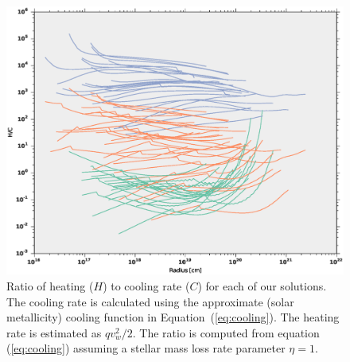 \documentclass[usenatbib,fleqn]{mn2e}
\newcommand{\vw}{v_w}
\begin{document}
\begin{figure}
  \includegraphics[width=\columnwidth]{cooling.eps}
  \caption{\label{fig:cooling} Ratio of heating ($H$) to cooling rate ($C$) for each of our solutions. The cooling rate is calculated using the approximate (solar metallicity) cooling function in Equation~(\ref{eq:cooling}). The heating rate is estimated as $q \vw^2/2$. The ratio is computed from equation (\ref{eq:cooling}) assuming a stellar mass loss rate parameter $\eta=1$.}
\end{figure}



\end{document}
